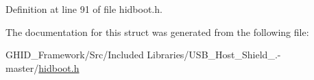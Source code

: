\-Definition at line 91 of file hidboot.\-h.



\-The documentation for this struct was generated from the following file\-:\begin{DoxyCompactItemize}
\item 
\-G\-H\-I\-D\-\_\-\-Framework/\-Src/\-Included Libraries/\-U\-S\-B\-\_\-\-Host\-\_\-\-Shield\-\_.-\/master/\hyperlink{hidboot_8h}{hidboot.\-h}\end{DoxyCompactItemize}
